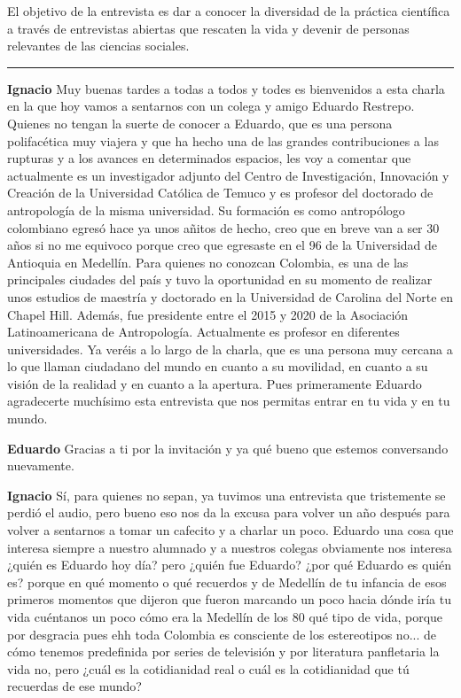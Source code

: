 \documentclass[
  spanish,
  11pt,
  a4paper,
]{scrbook}
\newenvironment{transcripcion}{
    \begin{list}{}{
        \setlength{\leftmargin}{1.5em}  %
        \setlength{\rightmargin}{0em}
        \setlength{\itemsep}{0.2em}     %
        \setlength{\parsep}{0.0em}
        \setlength{\listparindent}{0pt}
    }
}{
    \end{list}
}
\newcommand{\personaje}[1]{\textbf{#1}\quad}
\begin{document}
El objetivo de la entrevista es dar a conocer la diversidad de la
práctica científica a través de entrevistas abiertas que rescaten la
vida y devenir de personas relevantes de las ciencias sociales.
\endgroup

\begin{center}\rule{0.5\linewidth}{0.5pt}\end{center}

\begin{transcripcion}
\item \personaje{Ignacio} Muy buenas tardes a todas a todos y todes es bienvenidos a esta charla en la que hoy vamos a sentarnos con un colega y amigo Eduardo Restrepo. Quienes no tengan la suerte de conocer a Eduardo, que es una persona polifacética muy viajera y que ha hecho una de las grandes contribuciones a las rupturas y a los avances en determinados espacios, les voy a comentar que actualmente es un investigador adjunto del Centro de Investigación, Innovación y Creación de la Universidad Católica de Temuco y es profesor del doctorado de antropología de la misma universidad. Su formación es como antropólogo colombiano egresó hace ya unos añitos de hecho, creo que en breve van a ser 30 años si no me equivoco porque creo que egresaste en el 96 de la Universidad de Antioquia en Medellín. Para quienes no conozcan Colombia, es una de las principales ciudades del país y tuvo la oportunidad en su momento de realizar unos estudios de maestría y doctorado en la Universidad de Carolina del Norte en Chapel Hill. Además, fue presidente entre el 2015 y 2020 de la Asociación Latinoamericana de Antropología. Actualmente es profesor en diferentes universidades. Ya veréis a lo largo de la charla, que es una persona muy cercana a lo que llaman ciudadano del mundo en cuanto a su movilidad, en cuanto a su visión de la realidad y en cuanto a la apertura. Pues primeramente Eduardo agradecerte muchísimo esta entrevista que nos permitas entrar en tu vida y en tu mundo.

\item \personaje{Eduardo} Gracias a ti por la invitación y ya qué bueno que estemos conversando nuevamente.

\item \personaje{Ignacio} Sí, para quienes no sepan, ya tuvimos una entrevista que tristemente se perdió el audio, pero bueno eso nos da la excusa para volver un año después para volver a sentarnos a tomar un cafecito y a charlar un poco. Eduardo una cosa que interesa siempre a nuestro alumnado y a nuestros colegas obviamente nos interesa ¿quién es Eduardo hoy día? pero ¿quién fue Eduardo? ¿por qué Eduardo es quién es? porque en qué momento o qué recuerdos y de Medellín de tu infancia de esos primeros momentos que dijeron que fueron marcando un poco hacia dónde iría tu vida cuéntanos un poco cómo era la Medellín de los 80 qué tipo de vida, porque por desgracia pues ehh toda Colombia es consciente de los estereotipos no... de cómo tenemos predefinida por series de televisión y por literatura panfletaria la vida no, pero ¿cuál es la cotidianidad real o cuál es la cotidianidad que tú recuerdas de ese mundo?


\end{transcripcion}
\end{document}
